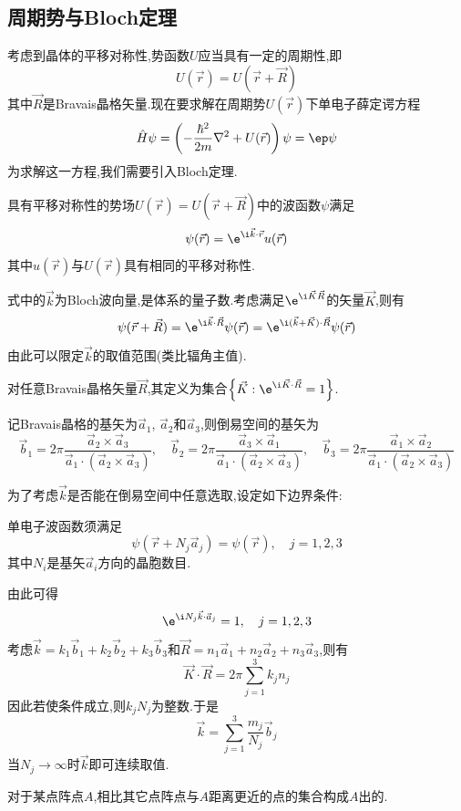 \documentclass{ctexbook}
\begin{document}
\subsection{周期势与Bloch定理}
考虑到晶体的平移对称性,势函数$U$应当具有一定的周期性,即
\[U(\vec{r})=U(\vec{r}+\vec{R})\]
其中$\vec{R}$是Bravais晶格矢量.现在要求解在周期势$U(\vec{r})$下单电子薛定谔方程
\[\hat{H}\psi=\left(-\dfrac{\hbar^2}{2m}\nabla^2+U(\vec{r})\right)\psi=\ep\psi\]
为求解这一方程,我们需要引入Bloch定理.
\begin{theorem}[Bloch定理]
    具有平移对称性的势场$U(\vec{r})=U(\vec{r}+\vec{R})$中的波函数$\psi$满足
    \[\psi(\vec{r})=\e^{\i\vec{k}\cdot\vec{r}}u(\vec{r})\]
    其中$u(\vec{r})$与$U(\vec{r})$具有相同的平移对称性.
\end{theorem}
式中的$\vec{k}$为Bloch波向量,是体系的量子数.考虑满足$\e^{\i\vec{K}\vec{R}}$的矢量$\vec{K}$,则有
\[\psi(\vec{r}+\vec{R})=\e^{\i\vec{k}\cdot\vec{R}}\psi(\vec{r})=\e^{\i(\vec{k}+\vec{K})\cdot\vec{R}}\psi(\vec{r})\]
由此可以限定$\vec{k}$的取值范围(类比辐角主值).
\begin{definition}[倒易空间]
    对任意Bravais晶格矢量$\vec{R}$,其定义为集合$\left\{\vec{K}:\e^{\i\vec{K}\cdot\vec{R}}=1\right\}$.
\end{definition}
\begin{theorem}[倒易空间的基矢]
    记Bravais晶格的基矢为$\vec{a}_1$, $\vec{a}_2$和$\vec{a}_3$,则倒易空间的基矢为
    \[\vec{b}_1=2\pi\dfrac{\vec{a}_2\times\vec{a}_3}{\vec{a}_1\cdot(\vec{a}_2\times\vec{a}_3)},\quad\vec{b}_2=2\pi\dfrac{\vec{a}_3\times\vec{a}_1}{\vec{a}_1\cdot(\vec{a}_2\times\vec{a}_3)},\quad\vec{b}_3=2\pi\dfrac{\vec{a}_1\times\vec{a}_2}{\vec{a}_1\cdot(\vec{a}_2\times\vec{a}_3)}\]
\end{theorem}
为了考虑$\vec{k}$是否能在倒易空间中任意选取,设定如下边界条件:
\begin{definition}
    单电子波函数须满足
    \[\psi(\vec{r}+N_j\vec{a}_j)=\psi(\vec{r}),\quad j=1,2,3\]
    其中$N_i$是基矢$\vec{a}_i$方向的晶胞数目.
\end{definition}
由此可得
\[\e^{\i N_j\vec{k}\cdot\vec{a}_j}=1,\quad j=1,2,3\]
考虑$\vec{k}=k_1\vec{b}_1+k_2\vec{b}_2+k_3\vec{b}_3$和$\vec{R}=n_1\vec{a}_1+n_2\vec{a}_2+n_3\vec{a}_3$,则有
\[\vec{K}\cdot\vec{R}=2\pi\sum_{j=1}^{3}k_jn_j\]
因此若使条件成立,则$k_jN_j$为整数.于是
\[\vec{k}=\sum_{j=1}^{3}\dfrac{m_j}{N_j}\vec{b}_j\]
当$N_j\to\infty$时$\vec{k}$即可连续取值.
\begin{definition}
    对于某点阵点$A$,相比其它点阵点与$A$距离更近的点的集合构成$A$出的.
\end{definition}
\end{document}
